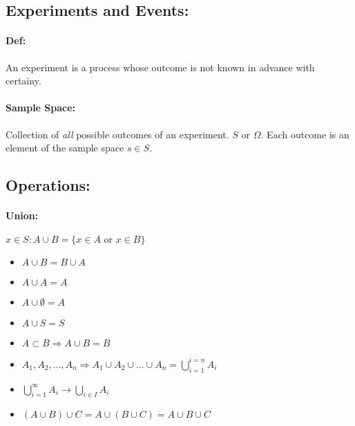 \documentclass{article}
\begin{document}
\begin{multicols}{3}
    \subsection*{Experiments and Events:}
        \paragraph*{Def:} An experiment is a process whose outcome is not known in advance with certainy.
        \paragraph*{Sample Space: } Collection of \textit{all} possible outcomes of an experiment. $S$ or $\Omega$. Each outcome is an element of the sample space $s \in S$.
    \subsection*{Operations: }
        \paragraph*{Union: } \( x \in S: A \cup B = \{x \in A \text{ or } x \in B\}\)
            \begin{itemize}
                \item[] \(A \cup B = B \cup A \)
                \item[] \(A \cup A = A \)
                \item[] \(A \cup \emptyset = A \)
                \item[] \(A \cup S = S \)
                \item[] \(A \subset B \Rightarrow A \cup B = B\)
                \item[] \(A_1, A_2, \dots, A_n \Rightarrow A_1 \cup A_2 \cup \dots \cup A_n = \bigcup\limits_{i=1}^{i=n} A_i\)
                \item[] \(\bigcup\limits_{i=1}^{\infty} A_i \rightarrow \bigcup\limits_{i\in I}A_i \)
                \item[] \( (A \cup B) \cup C = A \cup (B \cup C) = A \cup B \cup C \)
            \end{itemize}

\end{multicols}
\end{document}
